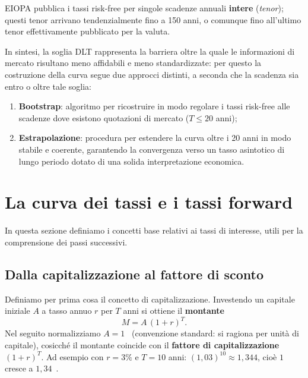 \documentclass[11pt,a4paper]{article}
\theoremstyle{plain}
\theoremstyle{definition}
\theoremstyle{remark}
\begin{document}
EIOPA pubblica i tassi risk-free per singole scadenze annuali \textbf{intere} (\emph{tenor}); questi
tenor arrivano tendenzialmente fino a 150 anni, o comunque fino all'ultimo tenor effettivamente
pubblicato per la valuta.

In sintesi, la soglia DLT rappresenta la barriera oltre la quale le informazioni di mercato risultano
meno affidabili e meno standardizzate: per questo la costruzione della curva segue due approcci
distinti, a seconda che la scadenza sia entro o oltre tale soglia:
\begin{enumerate}
  \item \textbf{Bootstrap}: algoritmo per ricostruire in modo regolare i tassi risk-free alle scadenze dove
        esistono quotazioni di mercato ($T \le 20$ anni);
  \item \textbf{Estrapolazione}: procedura per estendere la curva oltre i 20 anni in modo stabile e
        coerente, garantendo la convergenza verso un tasso asintotico di lungo periodo dotato di una solida interpretazione economica.
\end{enumerate}

\section{La curva dei tassi e i tassi forward}

In questa sezione definiamo i concetti base relativi ai tassi di interesse, utili per la comprensione dei passi successivi.

\subsection{Dalla capitalizzazione al fattore di sconto}

Definiamo per prima cosa il concetto di capitalizzazione.
Investendo un capitale iniziale $A$ a tasso annuo $r$ per $T$ anni si ottiene il
\textbf{montante}
\begin{equation}
  M = A\,(1+r)^T.
  \label{eq:montante}
\end{equation}
Nel seguito normalizziamo $A = 1$~\texteuro{} (convenzione standard: si ragiona per
unit\`a di capitale), cosicch\'e il montante coincide con il \textbf{fattore di
capitalizzazione} $(1+r)^T$. Ad esempio con $r=3\%$ e $T=10$ anni:
$(1{,}03)^{10} \approx 1{,}344$, cio\`e $1$~\texteuro{} cresce a $1{,}34$~\texteuro{}.
\end{document}
